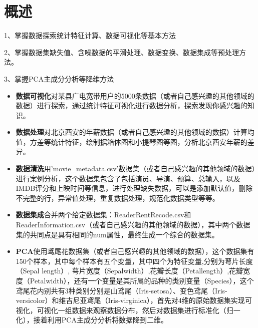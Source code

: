 \documentclass[a4paper]{article}
\begin{document}


\section{概述} \label{overview}%

1、掌握数据探索统计特征计算、数据可视化等基本方法

2、掌握数据集缺失值、含噪数据的平滑处理、数据变换、数据集成等预处理方法。

3、掌握PCA主成分分析等降维方法

\begin{itemize}
	\item{\textbf{数据可视化}对某县广电宽带用户的5000条数据（或者自己感兴趣的其他领域的数据）进行探索，通过统计特征可视化进行数据分析，探索发现你感兴趣的知识。}
    \item{\textbf{数据处理}对北京西安的年薪数据（或者自己感兴趣的其他领域的数据）计算均值，方差等统计特征，绘制据箱体图和小提琴图等图，分析北京西安年薪的差异。}
    \item{\textbf{数据清洗}用'movie\_metadata.csv'数据集（或者自己感兴趣的其他领域的数据）进行案例分析，这个数据集包含了包括演员、导演、预算、总输入，以及IMDB评分和上映时间等信息，进行处理缺失数据，可以是添加默认值，删除不完整的行，异常值处理，重复数据处理，规范化数据类型等等。
    }
    \item{\textbf{数据集成}合并两个给定数据集：ReaderRentRecode.csv和ReaderInformation.csv（或者自己感兴趣的其他领域的数据），其中两个数据集的共同点是具有相同的num属性，最终生成一个综合的数据集。
    }
    \item{\textbf{PCA}使用鸢尾花数据集（或者自己感兴趣的其他领域的数据），这个数据集有150个样本，其中每个样本有五个变量，其中四个为特征变量,分别为萼片长度（Sepal length）, 萼片宽度（Sepalwidth）,花瓣长度（Petallength）,花瓣宽度（Petalwidth），还有一个变量是其所属的品种的类别变量（Species），这个鸢尾花内别共有3种类别分别是山鸢尾（Iris-setosa）、变色鸢尾（Iris-versicolor）和维吉尼亚鸢尾（Iris-virginica），首先对4维的原始数据集实现可视化，可视化一组数据来观察数据分布，然后对数据集进行标准化（归一化），接着利用PCA主成分分析将数据降到二维。}
\end{itemize}

\end{document}
